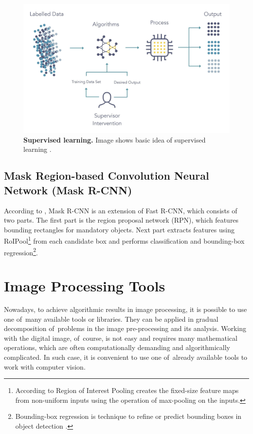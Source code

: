 \begin{figure}[!ht]
    \centering
    \includegraphics[width=.75\textwidth]{obrazky-figures/machine-learning-infographics-2-scaled.jpg}
     \caption{\textbf{Supervised learning.} Image shows basic idea of supervised learning \cite{supervised-learning}.}
    \label{supervised-img}
\end{figure}

\subsection{Mask Region-based Convolution Neural Network (Mask R-CNN)}
\label{mask-rcnn-framework}
According to \cite{mask-rcnn}, Mask R-CNN is an extension of Fast R-CNN, which consists of two parts. The first part is the region proposal network (RPN), which features bounding rectangles for mandatory objects. Next part extracts features using RoIPool\footnote{According to \cite{Pooling} Region of Interest Pooling creates the fixed-size feature maps from non-uniform inputs using the operation of max-pooling on the inputs.} from each candidate box and performs classification and bounding-box regression\footnote{Bounding-box regression is technique to refine or predict bounding boxes in object detection \cite{bbox-regression}.}.

\section{Image Processing Tools}
Nowadays, to achieve algorithmic results in image processing, it is possible to use one of~many available tools or libraries. They can be applied in gradual decomposition of~problems in the image pre-processing and its analysis. Working with the digital image, of~course, is not easy and requires
many mathematical operations, which are often computationally demanding and algorithmically complicated. In such case, it is convenient to use one of~already available tools to work with computer vision.

